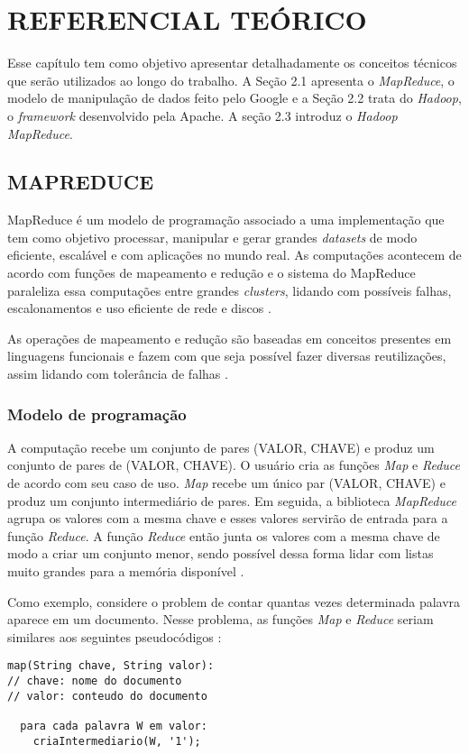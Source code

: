 \chapter{REFERENCIAL TEÓRICO} \label{cha:refteorico}

Esse capítulo tem como objetivo apresentar detalhadamente os conceitos técnicos que serão utilizados ao longo do trabalho. A Seção 2.1 apresenta o \textit{MapReduce}, o modelo de manipulação de dados feito pelo Google e a Seção 2.2 trata do \textit{Hadoop}, o \textit{framework} desenvolvido pela Apache. A seção 2.3 introduz o \textit{Hadoop MapReduce}.

\section{MAPREDUCE} \label{sec:mapreduce}

MapReduce é um modelo de programação associado a uma implementação que tem como objetivo processar, manipular e gerar grandes \textit{datasets} de modo eficiente, escalável e com aplicações no mundo real. As computações acontecem de acordo com funções de mapeamento e redução e o sistema do MapReduce paraleliza essa computações entre grandes \textit{clusters}, lidando com possíveis falhas, escalonamentos e uso eficiente de rede e discos \cite{MapReduce08}.

As operações de mapeamento e redução são baseadas em conceitos presentes em linguagens funcionais e fazem com que seja possível fazer diversas reutilizações, assim lidando com tolerância de falhas \cite{MapReduce08}. 

\subsection{Modelo de programação}\label{ssec:mapreducemodelo}

A computação recebe um conjunto de pares (VALOR, CHAVE) e produz um conjunto de pares de (VALOR, CHAVE). O usuário cria as funções \textit{Map} e \textit{Reduce} de acordo com seu caso de uso. \textit{Map} recebe um único par (VALOR, CHAVE) e produz um conjunto intermediário de pares. Em seguida, a biblioteca \textit{MapReduce} agrupa os valores com a mesma chave e esses valores servirão de entrada para a função \textit{Reduce}. A função \textit{Reduce} então junta os valores com a mesma chave de modo a criar um conjunto menor, sendo possível dessa forma lidar com listas muito grandes para a memória disponível \cite{MapReduce04}.

Como exemplo, considere o problem de contar quantas vezes determinada palavra aparece em um documento. Nesse problema, as funções \textit{Map} e \textit{Reduce} seriam similares aos seguintes pseudocódigos \cite{MapReduce08}:
\newpage
\begin{lstlisting}[title={Código 1: Exemplo de função Map em pseudocódigo adaptado de \cite{MapReduce08}}]
map(String chave, String valor):
// chave: nome do documento
// valor: conteudo do documento

  para cada palavra W em valor:
    criaIntermediario(W, '1');
\end{lstlisting}

